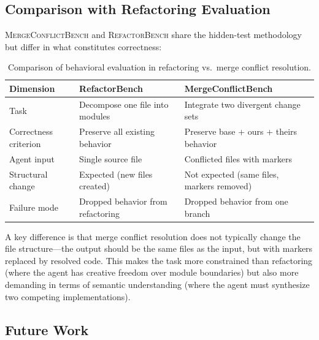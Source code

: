 \documentclass[11pt,a4paper]{article}
\begin{document}
\subsection{Comparison with Refactoring Evaluation}

\textsc{MergeConflictBench} and \textsc{RefactorBench} share the hidden-test methodology but differ in what constitutes correctness:

\begin{table}[ht]
\centering
\caption{Comparison of behavioral evaluation in refactoring vs.\ merge conflict resolution.}
\label{tab:comparison}
\small
\begin{tabularx}{\textwidth}{lXX}
\toprule
\textbf{Dimension} & \textbf{RefactorBench} & \textbf{MergeConflictBench} \\
\midrule
Task & Decompose one file into modules & Integrate two divergent change sets \\
Correctness criterion & Preserve all existing behavior & Preserve base + ours + theirs behavior \\
Agent input & Single source file & Conflicted files with markers \\
Structural change & Expected (new files created) & Not expected (same files, markers removed) \\
Failure mode & Dropped behavior from refactoring & Dropped behavior from one branch \\
\bottomrule
\end{tabularx}
\end{table}

A key difference is that merge conflict resolution does not typically change the file structure---the output should be the same files as the input, but with markers replaced by resolved code. This makes the task more constrained than refactoring (where the agent has creative freedom over module boundaries) but also more demanding in terms of semantic understanding (where the agent must synthesize two competing implementations).

\subsection{Future Work}
\end{document}
